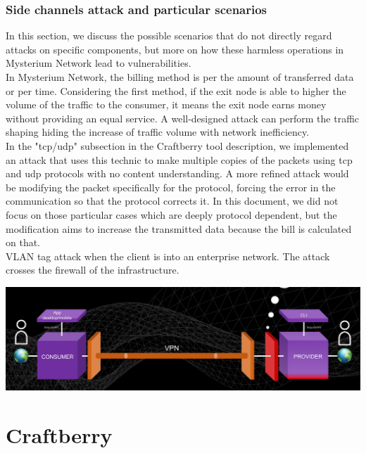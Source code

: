 \documentclass[12pt]{article}
\begin{document}
	\subsubsection{Side channels attack and particular scenarios}
	In this section, we discuss the possible scenarios that do not directly regard attacks on specific components, but more on how these harmless operations in Mysterium Network lead to vulnerabilities.\\
	In Mysterium Network, the billing method is per the amount of transferred data or per time. Considering the first method, if the exit node is able to higher the volume of the traffic to the consumer, it means the exit node earns money without providing an equal service. A well-designed attack can perform the traffic shaping hiding the increase of traffic volume with network inefficiency.\\
	In the "tcp/udp" subsection in the Craftberry tool description, we implemented an attack that uses this technic to make multiple copies of the packets using tcp and udp protocols with no content understanding. A more refined attack would be modifying the packet specifically for the protocol, forcing the error in the communication so that the protocol corrects it. In this document, we did not focus on those particular cases which are deeply protocol dependent, but the modification aims to increase the transmitted data because the bill is calculated on that.\\
	
	VLAN tag attack when the client is into an enterprise network. The attack crosses the firewall of the infrastructure.

	\begin{center}
		\includegraphics[width=\linewidth]{images/client_server_vpn_connection.png}
	\end{center}

	\section{Craftberry}
\end{document}
